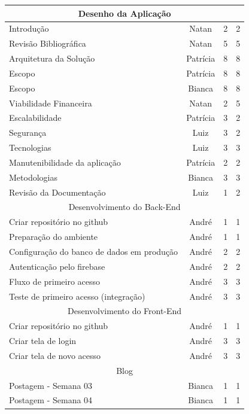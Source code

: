 \begin{apendicesenv}
\begin{quadro}[htb]
\begin{tabular}{|l|c|c|c|}
    \multicolumn{4}{|c|}{Desenho da Aplicação} \\ \hline
    Introdução  & Natan & 2 & 2   \\ \hline 
    Revisão Bibliográfica  & Natan & 5 & 5   \\ \hline 
    Arquitetura da Solução  & Patrícia & 8  & 8   \\ \hline 
    Escopo  & Patrícia & 8 & 8   \\ \hline 
    Escopo  & Bianca & 8  & 8   \\ \hline 
    Viabilidade Financeira  & Natan & 2  & 5   \\ \hline 
    Escalabilidade  & Patrícia & 3  & 2  \\ \hline 
    Segurança  & Luiz & 3 &  2  \\ \hline 
    Tecnologias  & Luiz & 3 & 3   \\ \hline 
    Manutenibilidade da aplicação  & Patrícia & 2  & 2   \\ \hline 
    Metodologias  & Bianca & 3  & 3   \\ \hline 
    Revisão da Documentação  & Luiz & 1  & 2\\ \hline 
    
    \multicolumn{4}{|c|}{Desenvolvimento do Back-End} \\ \hline
    Criar repositório no github & André & 1  &  1  \\ \hline 
    Preparação do ambiente & André & 1  &  1  \\ \hline 
    Configuração do banco de dados em produção & André & 2  & 2   \\ \hline 
    Autenticação pelo firebase & André & 2  & 2   \\ \hline 
    Fluxo de primeiro acesso & André & 3  & 3   \\ \hline 
    Teste de primeiro acesso (integração) & André & 3  & 3  \\ \hline 
    
    \multicolumn{4}{|c|}{Desenvolvimento do Front-End} \\ \hline
    Criar repositório no github & André & 1  & 1  \\ \hline 
    Criar tela de login & André & 3  & 3   \\ \hline 
    Criar tela de novo acesso & André & 3  & 3 \\ \hline 
    
    \multicolumn{4}{|c|}{Blog} \\ \hline
    Postagem - Semana 03      & Bianca    & 1  & 1    \\ \hline
    Postagem - Semana 04      & Bianca     & 1  & 1  \\ \hline
    

\end{tabular}
\end{quadro}
\end{apendicesenv}
